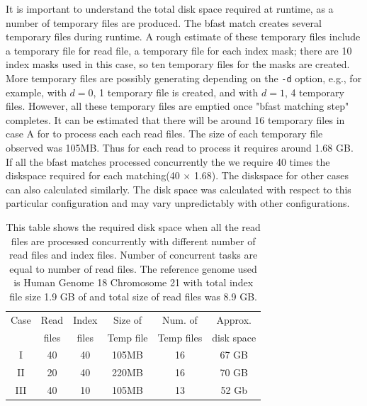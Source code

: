 \documentclass{acm_proc_article-sp}
\begin{document}
It is important to understand the total disk space required at
runtime, as a number of temporary files are produced.  The bfast match
creates several temporary files during runtime. A rough estimate of
these temporary files include a temporary file for read file, a
temporary file for each index mask; there are 10 index masks used in
this case, so ten temporary files for the masks are created.  More
temporary files are possibly generating depending on the \texttt{-d}
option, e.g., for example, with $d=0$, 1 temporary file is created,
and with $d=1$, 4 temporary files.  However, all these temporary files
are emptied once "bfast matching step" completes.  It can be estimated
that there will be around 16 temporary files in case A for to process
each each read files. The size of each temporary file observed was
105MB. Thus for each read to process it requires around 1.68 GB. If
all the bfast matches processed concurrently the we require 40 times
the diskspace required for each matching(40 $\times$ 1.68).  The
diskspace for other cases can also calculated similarly. The disk
space was calculated with respect to this particular configuration and
may vary unpredictably with other configurations.

\begin{table}
 \begin{tabular}{|c|c|c|c|c|c|} 
 \hline 
Case &Read& Index& Size of&  Num. of & Approx.  \\
 &files &  files  & Temp file & Temp files & disk space\\
 \hline
I&40 & 40 &105MB & 16 &67 GB \\
II&20 & 40 & 220MB & 16 &70 GB \\
III&40 & 10 & 105MB & 13 &52 Gb \\ 
 \hline
 \end{tabular}
 \label{table:dynamic-diskspace} 
 \caption{This table shows the required disk space when all the read files
   are processed concurrently with different number of read files and
   index files. Number of concurrent tasks are equal to number of read
   files. The reference genome used is Human Genome 18
   Chromosome 21 with total index file size 1.9 GB of and total size
   of read files was 8.9 GB.  }
\end{table}

\end{document}
